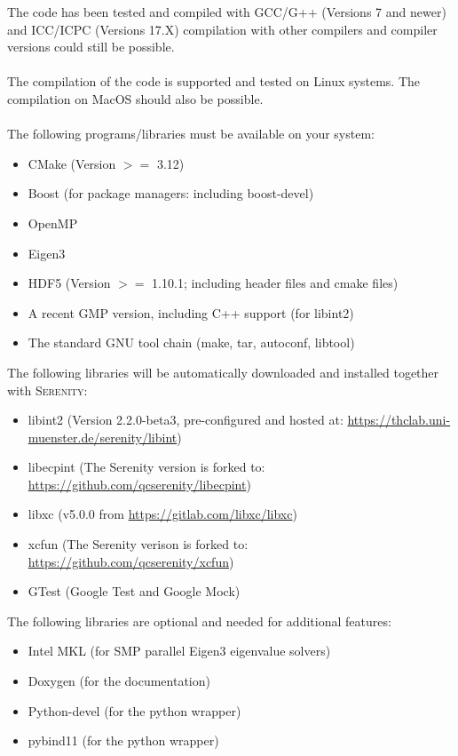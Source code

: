\documentclass[bibliography=totocnumbered,a4paper,10pt,oneside]{scrbook}
\newcommand{
\serenity}{\textsc{Serenity}\xspace}
\begin{document}
The code has been tested and compiled with GCC/G++ (Versions 7 and newer)
and ICC/ICPC (Versions 17.X) compilation with other compilers and compiler versions
could still be possible.\\
\\
The compilation of the code is supported and tested on Linux systems.
The compilation on MacOS should also be possible.\\
\\
The following programs/libraries must be available on your system:
\begin{itemize}
 \item CMake (Version $>=$ 3.12)
 \item Boost (for package managers: including boost-devel)
 \item OpenMP
 \item Eigen3
 \item HDF5 (Version $>=$ 1.10.1; including header files and cmake files)
 \item A recent GMP version, including C++ support (for libint2)
 \item The standard GNU tool chain (make, tar, autoconf, libtool)
\end{itemize}
The following libraries will be automatically downloaded and installed together
with \serenity:
\begin{itemize}
 \item libint2 (Version 2.2.0-beta3, pre-configured and hosted at: \url{https://thclab.uni-muenster.de/serenity/libint})
 \item libecpint (The Serenity version is forked to: \url{https://github.com/qcserenity/libecpint})
 \item libxc (v5.0.0 from \url{https://gitlab.com/libxc/libxc})
 \item xcfun (The Serenity verison is forked to: \url{https://github.com/qcserenity/xcfun})
 \item GTest (Google Test and Google Mock)
\end{itemize}
The following libraries are optional and needed for additional features:
\begin{itemize}
 \item Intel MKL (for SMP parallel Eigen3 eigenvalue solvers)
 \item Doxygen (for the documentation)
 \item Python-devel (for the python wrapper)
 \item pybind11 (for the python wrapper)
\end{itemize}
\end{document}
